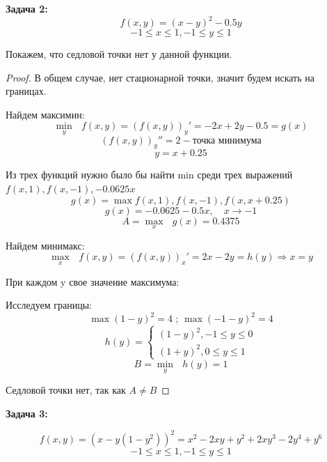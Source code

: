 \documentclass[aps,%
12pt,%
final,%
oneside,
onecolumn,%
musixtex, %
superscriptaddress,%
centertags]{article} %
\theoremstyle{plain}
\theoremstyle{definition}
\theoremstyle{remark}
\begin{document}
\textbf{Задача 2:}
$$ f(x,y) = (x-y)^2 - 0.5y $$
$$ -1 \leq x \leq 1,-1 \leq y \leq 1 $$

Покажем, что седловой точки нет у данной функции.
\begin{proof}
  В общем случае, нет стационарной точки, значит будем искать на границах.

  Найдем максимин:
  $$ \underset{y}{\min} \text{ } f(x,y) = (f(x,y))_y'  = -2x + 2y -0.5 = g(x)$$
  $$(f(x,y))_y'' = 2  -\text{точка минимума}$$ 
  $$ y = x + 0.25$$

  Из трех функций нужно было бы найти min среди трех выражений $f(x,1),f(x,-1),-0.0625x$
  $$g(x) = \max{f(x,1),f(x,-1),f(x,x+0.25)}$$
  $$ g(x) = -0.0625 - 0.5 x,\quad  x\to -1 $$
  $$ A = \underset{x}{\max} \text{ } g(x) = 0.4375 $$

  Найдем минимакс:
  $$ \underset{x}{\max} \text{ } f(x,y) = (f(x,y))_x'  = 2x -  2y = h(y) \Rightarrow x = y$$

  При каждом y свое значение максимума:

  Исследуем границы:
  $$ \max (1-y)^2 = 4 \text{ ;  } \max (-1-y)^2 = 4 $$
  $$h(y) = \left\{\begin{matrix}
  (1-y)^2, -1 \leq y \leq 0\\ 
  (1+y)^2, 0 \leq y \leq 1
  \end{matrix}\right.$$
  $$ B = \underset{y}{\min} \text{ } h(y) = 1 $$

  Седловой точки нет, так как $A \neq B$
\end{proof}

\textbf{Задача 3:}

$$ f(x,y) = (x-y(1-y^2))^2 = x^2 - 2 x y + y^2 + 2 x y^3 - 2 y^4 + y^6$$
$$ -1 \leq x \leq 1,-1 \leq y \leq 1 $$
\end{document}
